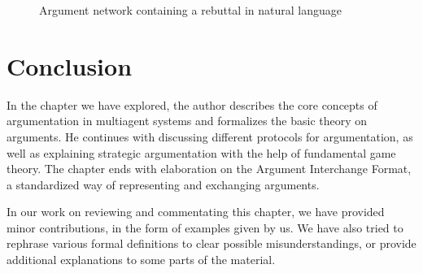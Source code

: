 \documentclass[12pt, a4paper]{article}
\begin{document}
\begin{figure}
\centering
{}
\caption{Argument network containing a rebuttal in natural language} \label{rebutargnet}
\end{figure}

\section{Conclusion}
In the chapter we have explored, the author describes the core concepts of argumentation in multiagent systems and formalizes the basic theory on arguments. He continues with discussing different protocols for argumentation, as well as explaining strategic argumentation with the help of fundamental game theory. The chapter ends with elaboration on the Argument Interchange Format, a standardized way of representing and exchanging arguments.

In our work on reviewing and commentating this chapter, we have provided minor contributions, in the form of examples given by us. We have also tried to rephrase various formal definitions to clear possible misunderstandings, or provide additional explanations to some parts of the material.

\printbibliography[heading=bibintoc]
\end{document}
